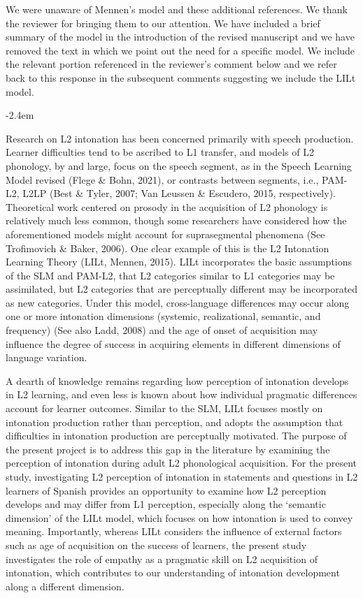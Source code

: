 \documentclass[]{article}
\renewenvironment{quote}{\begin{fquote}\advance\leftmargini -2.4em\begin{oldquote}}{\end{oldquote}\end{fquote}}
\newenvironment{fquote}
  {\def\FrameCommand{
	\fboxsep=0.6em %
	\fcolorbox{black}{white}}%
    \MakeFramed {\advance\hsize-2\width \FrameRestore}
    \begin{minipage}{\linewidth}
  }
  {\end{minipage}\endMakeFramed}
\begin{document}
We were unaware of Mennen's model and these additional references.
We thank the reviewer for bringing them to our attention.
We have included a brief summary of the model in the introduction of the revised manuscript and we have removed the text in which we point out the need for a specific model.
We include the relevant portion referenced in the reviewer's comment below and we refer back to this response in the subsequent comments suggesting we include the LILt model.

\begin{quote}
Research on L2 intonation has been concerned primarily with speech production.
Learner difficulties tend to be ascribed to L1 transfer, and models of L2 phonology, by and large, focus on the speech segment, as in the Speech Learning Model revised (Flege \& Bohn, 2021), or contrasts between segments, i.e., PAM-L2, L2LP (Best \& Tyler, 2007; Van Leussen \& Escudero, 2015, respectively).
Theoretical work centered on prosody in the acquisition of L2 phonology is relatively much less common, though some researchers have considered how the aforementioned models might account for suprasegmental phenomena (See Trofimovich \& Baker, 2006).
One clear example of this is the L2 Intonation Learning Theory (LILt, Mennen, 2015).
LILt incorporates the basic assumptions of the SLM and PAM-L2, that L2 categories similar to L1 categories may be assimilated, but L2 categories that are perceptually different may be incorporated as new categories.
Under this model, cross-language differences may occur along one or more intonation dimensions (systemic, realizational, semantic, and frequency) (See also Ladd, 2008) and the age of onset of acquisition may influence the degree of success in acquiring elements in different dimensions of language variation.

A dearth of knowledge remains regarding how perception of intonation develops in L2 learning, and even less is known about how individual pragmatic differences account for learner outcomes.
Similar to the SLM, LILt focuses mostly on intonation production rather than perception, and adopts the assumption that difficulties in intonation production are perceptually motivated.
The purpose of the present project is to address this gap in the literature by examining the perception of intonation during adult L2 phonological acquisition.
For the present study, investigating L2 perception of intonation in statements and questions in L2 learners of Spanish provides an opportunity to examine how L2 perception develops and may differ from L1 perception, especially along the `semantic dimension' of the LILt model, which focuses on how intonation is used to convey meaning.
Importantly, whereas LILt considers the influence of external factors such as age of acquisition on the success of learners, the present study investigates the role of empathy as a pragmatic skill on L2 acquisition of intonation, which contributes to our understanding of intonation development along a different dimension.
\end{quote}
\end{document}
